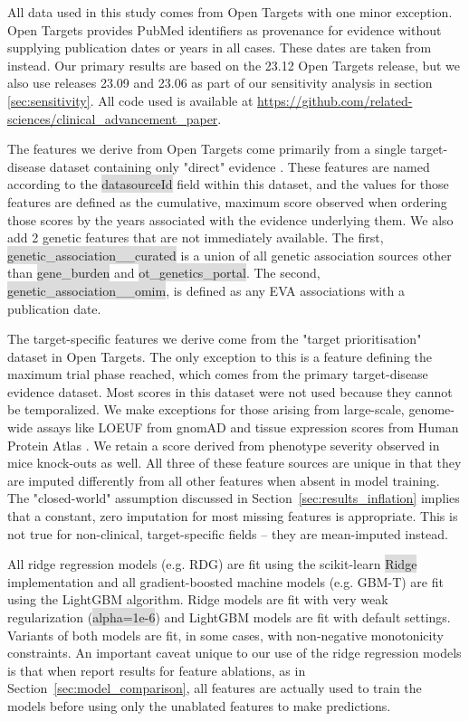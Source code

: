 \documentclass{article}
\begin{document}
All data used in this study comes from Open Targets with one minor exception. Open Targets provides PubMed identifiers as provenance for evidence without supplying publication dates or years in all cases. These dates are taken from \cite{PMID:33763309} instead. Our primary results are based on the 23.12 Open Targets release, but we also use releases 23.09 and 23.06 as part of our sensitivity analysis in section \ref{sec:sensitivity}. All code used is available at \url{https://github.com/related-sciences/clinical_advancement_paper}.

The features we derive from Open Targets come primarily from a single target-disease dataset containing only "direct" evidence \cite{OTdirectVsIndirect}. These features are named according to the \colorbox{Gainsboro}{datasourceId} field within this dataset, and the values for those features are defined as the cumulative, maximum score observed when ordering those scores by the years associated with the evidence underlying them. We also add 2 genetic features that are not immediately available. The first, \colorbox{Gainsboro}{genetic\_association\_\_curated} is a union of all genetic association sources other than \colorbox{Gainsboro}{gene\_burden} and \colorbox{Gainsboro}{ot\_genetics\_portal}. The second, \colorbox{Gainsboro}{genetic\_association\_\_omim}, is defined as any EVA associations with a publication date.

The target-specific features we derive come from the "target prioritisation" dataset \cite{OTtargetPrioritisation} in Open Targets. The only exception to this is a feature defining the maximum trial phase reached, which comes from the primary target-disease evidence dataset. Most scores in this dataset were not used because they cannot be temporalized. We make exceptions for those arising from large-scale, genome-wide assays like LOEUF from gnomAD \cite{PMID:32461654} and tissue expression scores from Human Protein Atlas \cite{PMID:25613900}. We retain a score derived from phenotype severity observed in mice knock-outs \cite{PMID:33231642} as well. All three of these feature sources are unique in that they are imputed differently from all other features when absent in model training. The "closed-world" assumption discussed in Section~\ref{sec:results_inflation} implies that a constant, zero imputation for most missing features is appropriate. This is not true for non-clinical, target-specific fields -- they are mean-imputed instead.

All ridge regression models (e.g. RDG) are fit using the scikit-learn \colorbox{Gainsboro}{Ridge} implementation and all gradient-boosted machine models (e.g. GBM-T) are fit using the LightGBM \cite{LightGBM} algorithm. Ridge models are fit with very weak regularization (\colorbox{Gainsboro}{alpha=1e-6}) and LightGBM models are fit with default settings. Variants of both models are fit, in some cases, with non-negative monotonicity constraints. An important caveat unique to our use of the ridge regression models is that when report results for feature ablations, as in Section~\ref{sec:model_comparison}, all features are actually used to train the models before using only the unablated features to make predictions.
\end{document}
